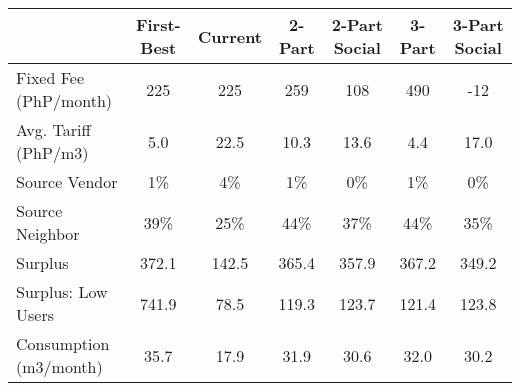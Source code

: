 \begin{tabular}{lcccccc}
  & First-Best & Current & 2-Part  & 2-Part Social  & 3-Part & 3-Part Social \\
\hline
Fixed Fee (PhP/month) &225&225&259&108&490&-12\\
Avg. Tariff (PhP/m3) &5.0&22.5&10.3&13.6&4.4&17.0\\
Source Vendor &1\% &4\% &1\% &0\% &1\% &0\%\\
Source Neighbor &39\% &25\% &44\% &37\% &44\% &35\%\\
Surplus &372.1&142.5&365.4&357.9&367.2&349.2\\
Surplus: Low Users &741.9&78.5&119.3&123.7&121.4&123.8\\
Consumption (m3/month) &35.7&17.9&31.9&30.6&32.0&30.2\\
\hline
\end{tabular}
